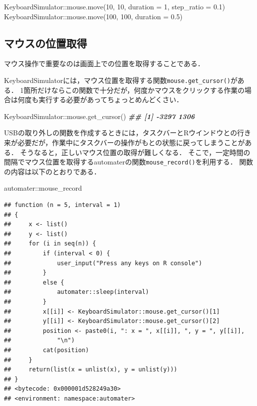 \documentclass[
]{article}
\newenvironment{Shaded}{\begin{snugshade}}{\end{snugshade}}
\newcommand{\AttributeTok}[1]{\textcolor[rgb]{0.77,0.63,0.00}{#1}}
\newcommand{\DecValTok}[1]{\textcolor[rgb]{0.00,0.00,0.81}{#1}}
\newcommand{\DocumentationTok}[1]{\textcolor[rgb]{0.56,0.35,0.01}{\textbf{\textit{#1}}}}
\newcommand{\FloatTok}[1]{\textcolor[rgb]{0.00,0.00,0.81}{#1}}
\newcommand{\FunctionTok}[1]{\textcolor[rgb]{0.00,0.00,0.00}{#1}}
\newcommand{\NormalTok}[1]{#1}
\newcommand{\SpecialCharTok}[1]{\textcolor[rgb]{0.00,0.00,0.00}{#1}}
\begin{document}
\begin{Shaded}
\begin{Highlighting}[]
\NormalTok{KeyboardSimulator}\SpecialCharTok{::}\FunctionTok{mouse.move}\NormalTok{(}\DecValTok{10}\NormalTok{, }\DecValTok{10}\NormalTok{, }\AttributeTok{duration =} \DecValTok{1}\NormalTok{, }\AttributeTok{step\_ratio =} \FloatTok{0.1}\NormalTok{)}
\NormalTok{KeyboardSimulator}\SpecialCharTok{::}\FunctionTok{mouse.move}\NormalTok{(}\DecValTok{100}\NormalTok{, }\DecValTok{100}\NormalTok{, }\AttributeTok{duration =} \FloatTok{0.5}\NormalTok{)}
\end{Highlighting}
\end{Shaded}

\hypertarget{ux30deux30a6ux30b9ux306eux4f4dux7f6eux53d6ux5f97}{%
\subsection{マウスの位置取得}\label{ux30deux30a6ux30b9ux306eux4f4dux7f6eux53d6ux5f97}}

マウス操作で重要なのは画面上での位置を取得することである．

KeyboardSimulatorには，マウス位置を取得する関数\texttt{mouse.get\_cursor()}がある．
1箇所だけならこの関数で十分だが，何度かマウスをクリックする作業の場合は何度も実行する必要があってちょっとめんどくさい．

\begin{Shaded}
\begin{Highlighting}[]
\NormalTok{KeyboardSimulator}\SpecialCharTok{::}\FunctionTok{mouse.get\_cursor}\NormalTok{()}
 \DocumentationTok{\#\# [1] {-}3297  1306}
\end{Highlighting}
\end{Shaded}

USBの取り外しの関数を作成するときには，タスクバーとRウインドウとの行き来が必要だが，作業中にタスクバーの操作がもとの状態に戻ってしまうことがある．
そうなると，正しいマウス位置の取得が難しくなる．
そこで，一定時間の間隔でマウス位置を取得するautomaterの関数\texttt{mouse\_record()}を利用する．
関数の内容は以下のとおりである．

\begin{Shaded}
\begin{Highlighting}[]
\NormalTok{automater}\SpecialCharTok{::}\NormalTok{mouse\_record}
\end{Highlighting}
\end{Shaded}

\begin{verbatim}
## function (n = 5, interval = 1) 
## {
##     x <- list()
##     y <- list()
##     for (i in seq(n)) {
##         if (interval < 0) {
##             user_input("Press any keys on R console")
##         }
##         else {
##             automater::sleep(interval)
##         }
##         x[[i]] <- KeyboardSimulator::mouse.get_cursor()[1]
##         y[[i]] <- KeyboardSimulator::mouse.get_cursor()[2]
##         position <- paste0(i, ": x = ", x[[i]], ", y = ", y[[i]], 
##             "\n")
##         cat(position)
##     }
##     return(list(x = unlist(x), y = unlist(y)))
## }
## <bytecode: 0x000001d528249a30>
## <environment: namespace:automater>
\end{verbatim}
\end{document}
